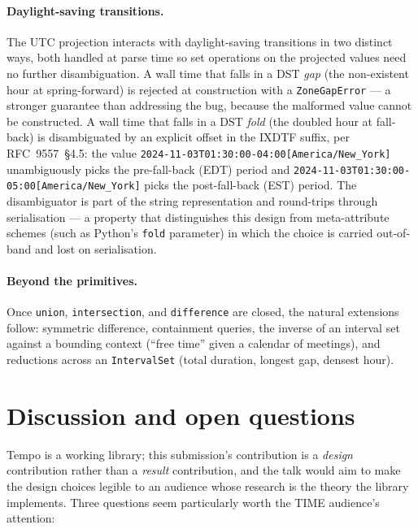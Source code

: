 \paragraph*{Daylight-saving transitions.} The UTC projection
interacts with daylight-saving transitions in two distinct ways,
both handled at parse time so set operations on the projected values
need no further disambiguation. A wall time that falls in a DST
\emph{gap} (the non-existent hour at spring-forward) is rejected at
construction with a \texttt{ZoneGapError} --- a stronger guarantee
than addressing the bug, because the malformed value cannot be
constructed. A wall time that falls in a DST \emph{fold} (the
doubled hour at fall-back) is disambiguated by an explicit offset in
the IXDTF suffix, per RFC~9557~\S 4.5: the value
\texttt{2024-11-03T01:30:00-04:00[America/New\_York]} unambiguously
picks the pre-fall-back (EDT) period and
\texttt{2024-11-03T01:30:00-05:00[America/New\_York]} picks the
post-fall-back (EST) period. The disambiguator is part of the
string representation and round-trips through serialisation --- a
property that distinguishes this design from meta-attribute
schemes (such as Python's \texttt{fold} parameter) in which the
choice is carried out-of-band and lost on serialisation.

\paragraph*{Beyond the primitives.} Once \texttt{union},
\texttt{intersection}, and \texttt{difference} are closed, the natural
extensions follow: symmetric difference, containment queries, the
inverse of an interval set against a bounding context (``free time''
given a calendar of meetings), and reductions across an
\texttt{IntervalSet} (total duration, longest gap, densest hour).

\section{Discussion and open questions}

Tempo is a working library; this submission's contribution is a
\emph{design} contribution rather than a \emph{result} contribution,
and the talk would aim to make the design choices legible to an
audience whose research is the theory the library implements. Three
questions seem particularly worth the TIME audience's attention:

